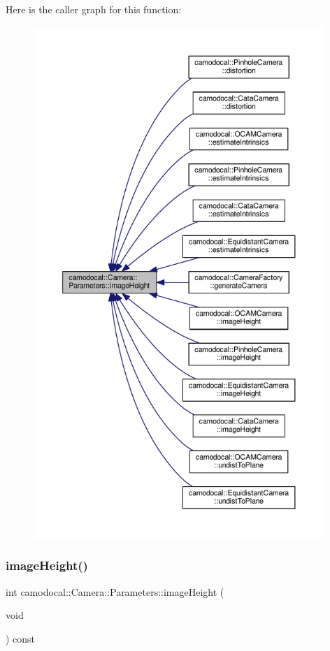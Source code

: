 Here is the caller graph for this function\+:\nopagebreak
\begin{figure}[H]
\begin{center}
\leavevmode
\includegraphics[height=550pt]{classcamodocal_1_1Camera_1_1Parameters_a2dcff4a5472ebc79d5d72762681220a3_icgraph}
\end{center}
\end{figure}
\mbox{\label{classcamodocal_1_1Camera_1_1Parameters_a2b41722deff54c1e34de59892ab604a2}} 
\subsubsection{\texorpdfstring{image\+Height()}{imageHeight()}\hspace{0.1cm}{\footnotesize\ttfamily [2/2]}}
{\footnotesize\ttfamily int camodocal\+::\+Camera\+::\+Parameters\+::image\+Height (\begin{DoxyParamCaption}\item[{void}]{ }\end{DoxyParamCaption}) const}



